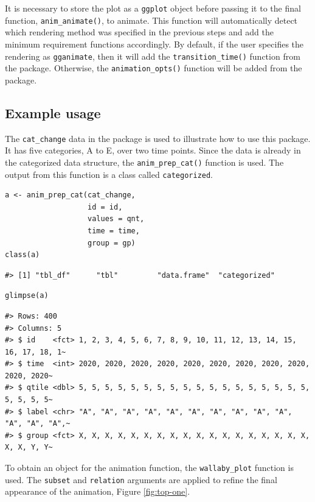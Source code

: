 It is necessary to store the plot as a \texttt{ggplot} object before passing it to the final function, \texttt{anim\_animate()}, to animate. This function will automatically detect which rendering method was specified in the previous steps and add the minimum requirement functions accordingly. By default, if the user specifies the rendering as \texttt{gganimate}, then it will add the \texttt{transition\_time()} function from the  package. Otherwise, the \texttt{animation\_opts()} function will be added from the  package.

\hypertarget{example-usage}{%
\subsection{Example usage}\label{example-usage}}

The \texttt{cat\_change} data in the package is used to illustrate how to use this package. It has five categories, A to E, over two time points. Since the data is already in the categorized data structure, the \texttt{anim\_prep\_cat()} function is used. The output from this function is a class called \texttt{categorized}.

\begin{verbatim}
a <- anim_prep_cat(cat_change, 
                   id = id, 
                   values = qnt, 
                   time = time, 
                   group = gp)
class(a)
\end{verbatim}

\begin{verbatim}
#> [1] "tbl_df"      "tbl"         "data.frame"  "categorized"
\end{verbatim}

\begin{verbatim}
glimpse(a)
\end{verbatim}

\begin{verbatim}
#> Rows: 400
#> Columns: 5
#> $ id    <fct> 1, 2, 3, 4, 5, 6, 7, 8, 9, 10, 11, 12, 13, 14, 15, 16, 17, 18, 1~
#> $ time  <int> 2020, 2020, 2020, 2020, 2020, 2020, 2020, 2020, 2020, 2020, 2020~
#> $ qtile <dbl> 5, 5, 5, 5, 5, 5, 5, 5, 5, 5, 5, 5, 5, 5, 5, 5, 5, 5, 5, 5, 5, 5~
#> $ label <chr> "A", "A", "A", "A", "A", "A", "A", "A", "A", "A", "A", "A", "A",~
#> $ group <fct> X, X, X, X, X, X, X, X, X, X, X, X, X, X, X, X, X, X, X, X, Y, Y~
\end{verbatim}

To obtain an object for the animation function, the \texttt{wallaby\_plot} function is used. The \texttt{subset} and \texttt{relation} arguments are applied to refine the final appearance of the animation, Figure \ref{fig:top-one}.

